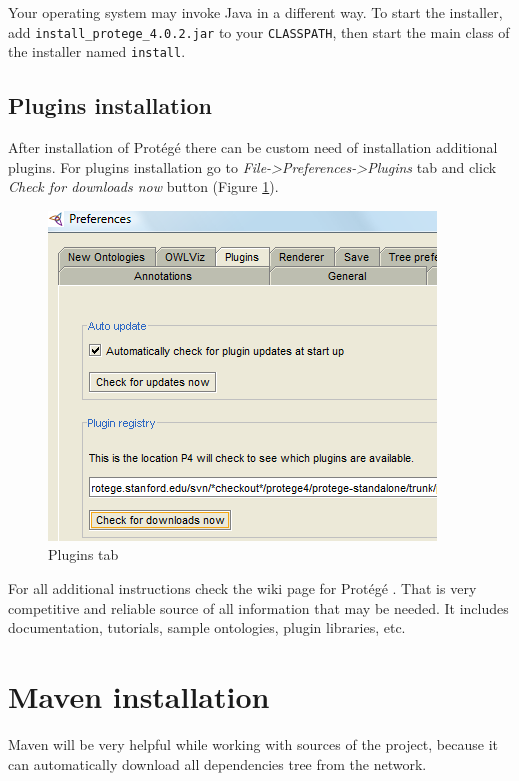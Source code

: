 Your operating system may invoke Java in a different way. To start the installer, add \texttt{install\_protege\_4.0.2.jar} to your \texttt{CLASSPATH}, then start the main class of the installer named \texttt{install}.

\newpage
\subsection{Plugins installation}
\label{sub:pluginsInstallation}

After installation of Protégé there can be custom need of installation additional plugins. For plugins installation go to \textit{File->Preferences->Plugins} tab and click \textit{Check for downloads now} button (Figure \ref{fig:plugins}). 

\medskip

\begin{figure}[htp]
\centering
\includegraphics[scale=0.7]{images/appendixA/PreferencesPlugins}
\caption{Plugins tab}
\label{fig:plugins}
\end{figure}

For all additional instructions check the wiki page for Protégé \cite{ProtegeWiki}. That is very competitive and reliable source of all information that may be needed. It includes documentation, tutorials, sample ontologies, plugin libraries, etc.

\section{Maven installation}
\label{sec:mavenInstallation}

Maven will be very helpful while working with sources of the project, because it can automatically download all dependencies tree from the network.


